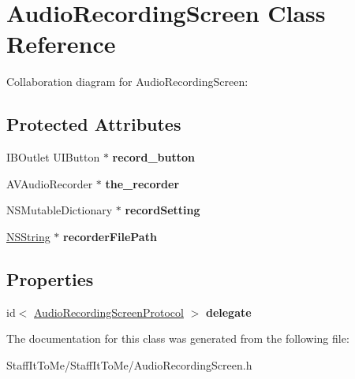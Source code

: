 \hypertarget{interface_audio_recording_screen}{
\section{\-Audio\-Recording\-Screen \-Class \-Reference}
\label{interface_audio_recording_screen}
}


\-Collaboration diagram for \-Audio\-Recording\-Screen\-:
\subsection*{\-Protected \-Attributes}
\begin{DoxyCompactItemize}
\item 
\hypertarget{interface_audio_recording_screen_a5f2834ae1319e8e418e3f7df3929d893}{
\-I\-B\-Outlet \-U\-I\-Button $\ast$ {\bfseries record\-\_\-button}}
\label{interface_audio_recording_screen_a5f2834ae1319e8e418e3f7df3929d893}

\item 
\hypertarget{interface_audio_recording_screen_aaf7c578975a3df54f5d7b2c1e1289cb6}{
\-A\-V\-Audio\-Recorder $\ast$ {\bfseries the\-\_\-recorder}}
\label{interface_audio_recording_screen_aaf7c578975a3df54f5d7b2c1e1289cb6}

\item 
\hypertarget{interface_audio_recording_screen_a8a8a5fd566b3e0e8998a7e51d31c12c6}{
\-N\-S\-Mutable\-Dictionary $\ast$ {\bfseries record\-Setting}}
\label{interface_audio_recording_screen_a8a8a5fd566b3e0e8998a7e51d31c12c6}

\item 
\hypertarget{interface_audio_recording_screen_ad912075add49d3918d200528077aee93}{
\hyperlink{class_n_s_string}{\-N\-S\-String} $\ast$ {\bfseries recorder\-File\-Path}}
\label{interface_audio_recording_screen_ad912075add49d3918d200528077aee93}

\end{DoxyCompactItemize}
\subsection*{\-Properties}
\begin{DoxyCompactItemize}
\item 
\hypertarget{interface_audio_recording_screen_ab12525ad2d157a7c83031eaf44cbad9d}{
id$<$ \hyperlink{protocol_audio_recording_screen_protocol-p}{\-Audio\-Recording\-Screen\-Protocol} $>$ {\bfseries delegate}}
\label{interface_audio_recording_screen_ab12525ad2d157a7c83031eaf44cbad9d}

\end{DoxyCompactItemize}


\-The documentation for this class was generated from the following file\-:\begin{DoxyCompactItemize}
\item 
\-Staff\-It\-To\-Me/\-Staff\-It\-To\-Me/\-Audio\-Recording\-Screen.\-h\end{DoxyCompactItemize}

